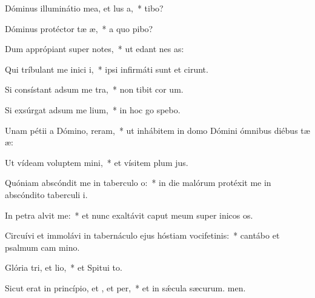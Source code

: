\item Dóminus illuminátio mea, et lus a,~*  tibo?
\item Dóminus protéctor tæ æ,~* a quo pibo?
\item Dum apprópiant super  notes,~* ut edant nes as:
\item Qui tríbulant me inici i,~* ipsi infirmáti sunt et cirunt.
\item Si consístant adsum me tra,~* non tibit cor um.
\item Si exsúrgat adsum me lium,~* in hoc go spebo.
\item Unam pétii a Dómino,  reram,~* ut inhábitem in domo Dómini ómnibus diébus tæ æ:
\item Ut vídeam voluptem mini,~* et vísitem plum jus.
\item Quóniam abscóndit me in taberculo o:~* in die malórum protéxit me in abscóndito taberculi i.
\item In petra alvit me:~* et nunc exaltávit caput meum super inicos os.
\item Circuívi et immolávi in tabernáculo ejus hóstiam vocifetinis:~* cantábo et psalmum cam mino.
\item Glória tri, et lio,~* et Spitui to.
\item Sicut erat in princípio, et , et per,~* et in sǽcula sæcurum. men.
